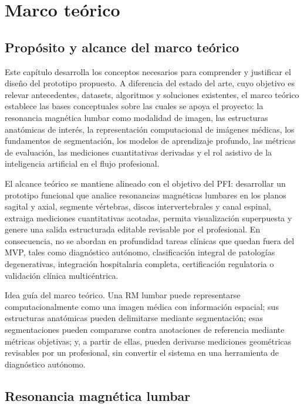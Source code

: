 \chapter{Marco teórico}

\section{Propósito y alcance del marco teórico}

Este capítulo desarrolla los conceptos necesarios para comprender y justificar el diseño del prototipo propuesto. A diferencia del estado del arte, cuyo objetivo es relevar antecedentes, datasets, algoritmos y soluciones existentes, el marco teórico establece las bases conceptuales sobre las cuales se apoya el proyecto: la resonancia magnética lumbar como modalidad de imagen, las estructuras anatómicas de interés, la representación computacional de imágenes médicas, los fundamentos de segmentación, los modelos de aprendizaje profundo, las métricas de evaluación, las mediciones cuantitativas derivadas y el rol asistivo de la inteligencia artificial en el flujo profesional.

El alcance teórico se mantiene alineado con el objetivo del PFI: desarrollar un prototipo funcional que analice resonancias magnéticas lumbares en los planos sagital y axial, segmente vértebras, discos intervertebrales y canal espinal, extraiga mediciones cuantitativas acotadas, permita visualización superpuesta y genere una salida estructurada editable revisable por el profesional. En consecuencia, no se abordan en profundidad tareas clínicas que quedan fuera del MVP, tales como diagnóstico autónomo, clasificación integral de patologías degenerativas, integración hospitalaria completa, certificación regulatoria o validación clínica multicéntrica.

Idea guía del marco teórico. Una RM lumbar puede representarse computacionalmente como una imagen médica con información espacial; sus estructuras anatómicas pueden delimitarse mediante segmentación; esas segmentaciones pueden compararse contra anotaciones de referencia mediante métricas objetivas; y, a partir de ellas, pueden derivarse mediciones geométricas revisables por un profesional, sin convertir el sistema en una herramienta de diagnóstico autónomo.

\section{Resonancia magnética lumbar}


